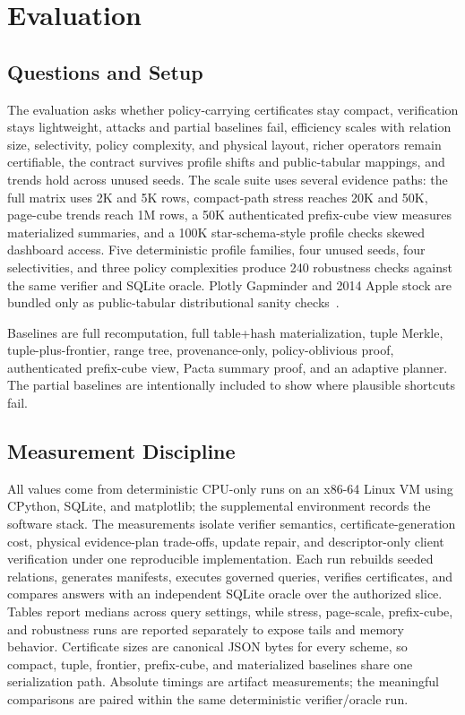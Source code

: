 \documentclass[conference]{IEEEtran}
\newcommand{\sys}{Pacta\xspace}
\begin{document}
\section{Evaluation}
\subsection{Questions and Setup}
The evaluation asks whether policy-carrying certificates stay compact, verification stays lightweight, attacks and partial baselines fail, efficiency scales with relation size, selectivity, policy complexity, and physical layout, richer operators remain certifiable, the contract survives profile shifts and public-tabular mappings, and trends hold across unused seeds. The scale suite uses several evidence paths: the full matrix uses 2K and 5K rows, compact-path stress reaches 20K and 50K, page-cube trends reach 1M rows, a 50K authenticated prefix-cube view measures materialized summaries, and a 100K star-schema-style profile checks skewed dashboard access. Five deterministic profile families, four unused seeds, four selectivities, and three policy complexities produce 240 robustness checks against the same verifier and SQLite oracle. Plotly Gapminder and 2014 Apple stock are bundled only as public-tabular distributional sanity checks~\cite{plotlygapminder,plotlyapple}.

Baselines are full recomputation, full table+hash materialization, tuple Merkle, tuple-plus-frontier, range tree, provenance-only, policy-oblivious proof, authenticated prefix-cube view, \sys summary proof, and an adaptive planner. The partial baselines are intentionally included to show where plausible shortcuts fail.

\subsection{Measurement Discipline}
All values come from deterministic CPU-only runs on an x86-64 Linux VM using CPython, SQLite, and matplotlib; the supplemental environment records the software stack. The measurements isolate verifier semantics, certificate-generation cost, physical evidence-plan trade-offs, update repair, and descriptor-only client verification under one reproducible implementation. Each run rebuilds seeded relations, generates manifests, executes governed queries, verifies certificates, and compares answers with an independent SQLite oracle over the authorized slice. Tables report medians across query settings, while stress, page-scale, prefix-cube, and robustness runs are reported separately to expose tails and memory behavior. Certificate sizes are canonical JSON bytes for every scheme, so compact, tuple, frontier, prefix-cube, and materialized baselines share one serialization path. Absolute timings are artifact measurements; the meaningful comparisons are paired within the same deterministic verifier/oracle run.
\end{document}
